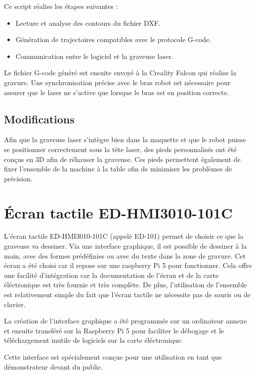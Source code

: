 Ce script réalise les étapes suivantes :
\begin{itemize}
    \item Lecture et analyse des contours du fichier DXF.
    \item Génération de trajectoires compatibles avec le protocole G-code.
    \item Communication entre le logiciel et la graveuse laser.
\end{itemize}

Le fichier G-code généré est ensuite envoyé à la Creality Falcon qui réalise la gravure. Une synchronisation précise avec le bras robot est nécessaire pour assurer que le laser ne s'active que lorsque le bras est en position correcte.

\subsection{Modifications}

Afin que la graveuse laser s'intègre bien dans la maquette et que le robot puisse se positionner correctement sous la tête laser, des pieds personnalisés ont été conçus en 3D afin de réhauser la graveuse. Ces pieds permettent également de fixer l'ensemble de la machine à la table afin de minimiser les problèmes de précision.

\section{Écran tactile ED-HMI3010-101C}

L’écran tactile ED-HMI3010-101C (appelé ED-101) permet de choisir ce que la graveuse va dessiner. Via une interface graphique, il est possible de dessiner à la main, avec des formes prédéfinies ou avec du texte dans la zone de gravure.
Cet écran a été choisi car il repose sur une raspberry Pi 5 pour fonctionner. Cela offre une facilité d'intégration car la documentation de l'écran et de la carte éléctronique est très fournie et très complète. De plus, l'utilisation de l'ensemble est relativement simple du fait que l'écran tactile ne nécessite pas de souris ou de clavier.

La création de l'interface graphique a été programmée sur un ordinateur annexe et ensuite transféré sur la Raspberry Pi 5 pour faciliter le débogage et le téléchargement inutile de logiciels sur la carte éléctronique.

Cette interface est spécialement conçue pour une utilisation en tant que démonstrateur devant du public.


